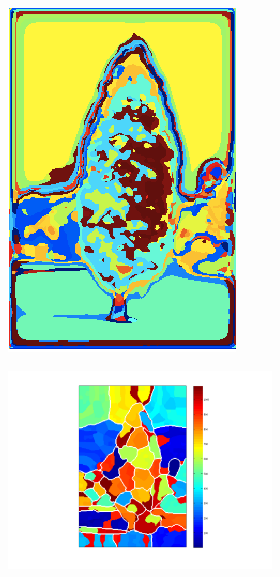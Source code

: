 \documentclass{article} %
\begin{document}
\begin{figure}
\begin{subfigure}[c]{\textwidth}
\begin{subfigure}[c]{0.195\textwidth}
			\includegraphics[width = \textwidth]{./img/2_21_s_map.png}
			\label{fig:2_21_s_map}
		\end{subfigure}
		\begin{subfigure}[]{0.195\textwidth}
			\includegraphics[width = \textwidth]{./img/su2_21_s.pdf}

\end{subfigure}
\end{subfigure}
\end{figure}
\end{document}

